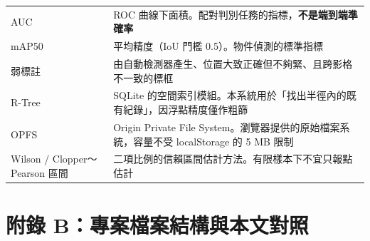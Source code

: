 \documentclass[11pt,a4paper,fontset=windows]{ctexart}
\newcommand{\dash}{\mbox{～}}
\begin{document}
\begin{longtable}{@{}p{4.2cm}p{11.4cm}@{}}
\addlinespace
AUC & ROC 曲線下面積。配對判別任務的指標，\textbf{不是端到端準確率} \\
\addlinespace
mAP50 & 平均精度（IoU 門檻 0.5）。物件偵測的標準指標 \\
\addlinespace
弱標註 & 由自動檢測器產生、位置大致正確但不夠緊、且跨影格不一致的標框 \\
\addlinespace
R-Tree & SQLite 的空間索引模組。本系統用於「找出半徑內的既有紀錄」，因浮點精度僅作粗篩 \\
\addlinespace
OPFS & Origin Private File System。瀏覽器提供的原始檔案系統，容量不受 localStorage 的 5 MB 限制 \\
\addlinespace
Wilson / Clopper\dash Pearson 區間 & 二項比例的信賴區間估計方法。有限樣本下不宜只報點估計 \\
\bottomrule
\end{longtable}

\section{附錄 B：專案檔案結構與本文對照}
\end{document}
